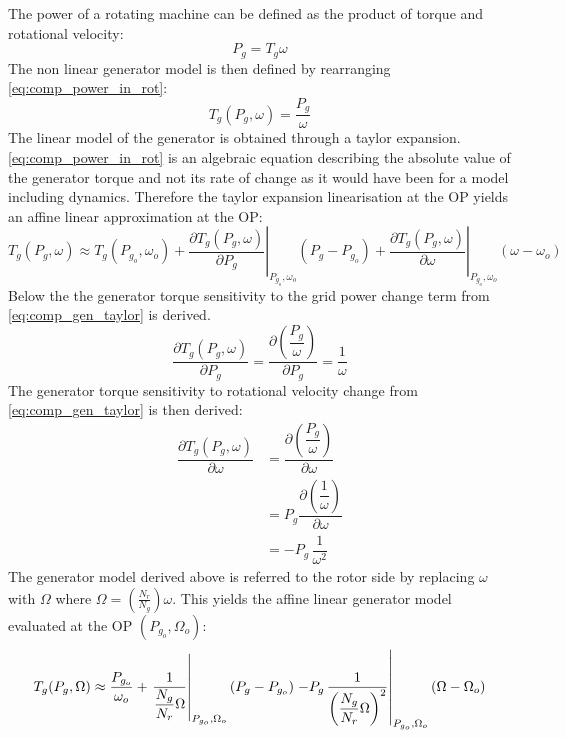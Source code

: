 The power of a rotating machine can be defined as the product of torque and rotational velocity:
\begin{equation}\label{eq:comp_power_in_rot}
	P_{g} = T_g \omega
\end{equation}
The non linear generator model is then defined by rearranging \cref{eq:comp_power_in_rot}:
\begin{equation}\label{eq:comp_gen_torque}
	T_g(P_g, \omega) = \dfrac{P_g}{\omega}
\end{equation}
The linear model of the generator is obtained through a taylor expansion. \cref{eq:comp_power_in_rot} is an algebraic equation describing the absolute value of the generator torque and not its rate of change as it would have been for a model including dynamics. Therefore the taylor expansion linearisation at the OP yields an affine linear approximation at the OP:
\begin{equation}\label{eq:comp_gen_taylor}
	T_g( P_g, \omega) \approx T_g(P_{g_o}, \omega_o) + 
	\left. \dfrac{\partial T_g( P_g, \omega)}{\partial P_g} \right |_{P_{g_o},\omega_o} ( P_g-P_{g_o}) + 
	\left. \dfrac{\partial T_g( P_g, \omega)}{\partial \omega} \right |_{P_{g_o},\omega_o} (\omega - \omega_o)
\end{equation}
Below the the generator torque sensitivity to the grid power change term from \cref{eq:comp_gen_taylor} is derived.
\begin{equation} 
	\dfrac{\partial T_g( P_g, \omega)}{\partial P_g} = \dfrac{\partial \left (\dfrac{P_g}{\omega}\right )}{\partial P_g} \label{eq:comp_gen_1} = \dfrac{1}{\omega}
\end{equation}
The generator torque sensitivity to rotational velocity change from \cref{eq:comp_gen_taylor} is then derived:
\begin{align}
	\dfrac{\partial T_g(P_g, \omega)}{\partial \omega} & = \dfrac{\partial \left (\dfrac{P_g}{\omega}\right )}{\partial \omega} \\
	& = P_g \dfrac{\partial \left (\dfrac{1}{\omega}\right )}{\partial \omega} \\
	& = -P_g \, \dfrac{1}{\omega^2}
\end{align}
The generator model derived above is referred to the rotor side by replacing $ \omega $ with $ \Omega $ where $ \Omega = \left (\frac{N_r}{N_g} \right ) \omega $. This yields the affine linear generator model evaluated at the OP $ (P_{g_o}, \Omega_o) $:
\begin{equation}
	T_g(P_g, \Omega) \approx \dfrac{P_{g_o}}{\omega_o} + \left. \dfrac{1}{\dfrac{N_g}{N_r} \Omega} \right |_{P_{g_o},\Omega_o} (P_g - P_{g_o}) \\ 
	\left. - P_g \, \dfrac{1}{\left( \dfrac{N_g}{N_r} \Omega \right)^2} \right |_{P_{g_o},\Omega_o} (\Omega - \Omega_o)
\end{equation}
